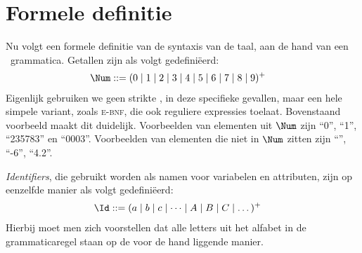 

\section{Formele definitie}

Nu volgt een formele definitie van de syntaxis van de taal, aan de hand van een \BNF\ grammatica. Getallen zijn als volgt gedefiniëerd:
%
\begin{align*}
  \Num \GrammarDef (0 \mid 1 \mid 2 \mid 3 \mid 4 \mid 5 \mid 6 \mid 7 \mid 8 \mid 9)^+
\end{align*}
%
Eigenlijk gebruiken we geen strikte \BNF, in deze specifieke gevallen, maar een hele simpele variant, zoals \textsc{e-bnf}, die ook reguliere expressies toelaat. Bovenstaand voorbeeld maakt dit duidelijk. Voorbeelden van elementen uit $\Num$ zijn ``0'', ``1'', ``235783'' en ``0003''. Voorbeelden van elementen die niet in $\Num$ zitten zijn ``'', ``-6'', ``4.2''.

\emph{Identifiers}, die gebruikt worden als namen voor variabelen en attributen, zijn op eenzelfde manier als volgt gedefiniëerd:
%
\begin{align*}
  \Id \GrammarDef (a \mid b \mid c \mid \dots \mid A \mid B \mid C \mid \dots)^+
\end{align*}
%
Hierbij moet men zich voorstellen dat alle letters uit het alfabet in de grammaticaregel staan op de voor de hand liggende manier.

